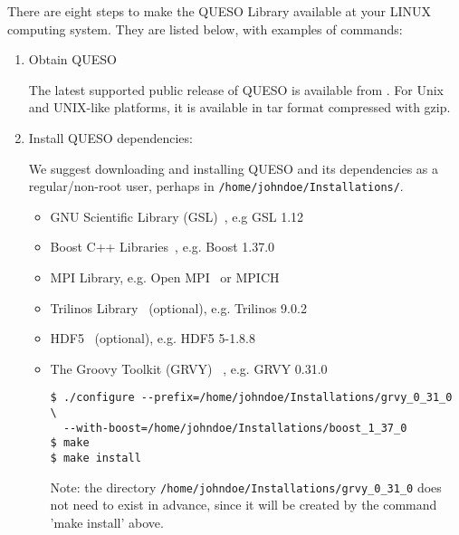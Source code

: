 There are eight steps to make the QUESO Library available at your LINUX computing system. 
They are listed below, with examples of commands:
%
\begin{enumerate}

\item Obtain QUESO

The latest supported public release of QUESO is available from \Quesoweb{}.
For Unix and UNIX-like platforms, it is available in tar format compressed with gzip.  %

\item {Install QUESO dependencies:

We suggest downloading and installing QUESO and its dependencies as a regular/non-root user, perhaps in \texttt{/home/johndoe/Installations/}. %

\begin{itemize}
\item GNU Scientific Library (GSL)~\cite{Gsl}, e.g GSL 1.12
\item Boost C++ Libraries~\cite{Boost}, e.g. Boost 1.37.0
\item MPI Library, e.g. Open MPI~\cite{Openmpi} or MPICH~\cite{Mpich}


\item Trilinos Library~\cite{Trilinos} (optional), e.g. Trilinos 9.0.2
\item HDF5~\cite{HDF5} (optional), e.g. HDF5  5-1.8.8 
\item{ The Groovy Toolkit (GRVY) ~\cite{grvy}, e.g. GRVY 0.31.0
\begin{verbatim}
$ ./configure --prefix=/home/johndoe/Installations/grvy_0_31_0 \
  --with-boost=/home/johndoe/Installations/boost_1_37_0
$ make 
$ make install
\end{verbatim}
Note: the directory \texttt{/home/johndoe/Installations/grvy\_0\_31\_0} does not need to exist in advance, since it will be created by the command 'make install' above.
}
\end{itemize}
}



\end{enumerate}
